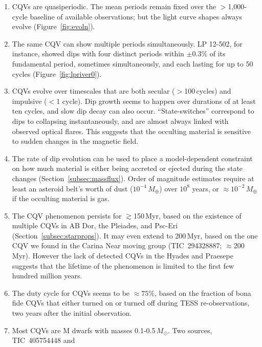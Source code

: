 \documentclass[11pt,twocolumn,tighten]{aastex63}
\begin{document}
\begin{enumerate}[leftmargin=*]
    \item CQVs are quasiperiodic.  The mean periods remain fixed over
      the $>$1{,}000-cycle baseline of available observations; but the
      light curve shapes always evolve (Figure~\ref{fig:evoln}).
    \item The same CQV can show multiple periods simultaneously.  LP
      12-502, for instance, showed dips with four distinct periods
      within $\pm 0.3\%$ of its fundamental period, sometimes
      simultaneously, and each lasting for up to 50 cycles
      (Figure~\ref{fig:lpriver0}).
    \item CQVs evolve over timescales that are both secular
      ($>$100\,cycles) and impulsive ($<$1 cycle).  Dip growth seems
      to happen over durations of at least ten cycles, and slow dip
      decay can also occur.  ``State-switches'' correspond to dips to
      collapsing instantaneously, and are almost always linked with
      observed optical flares.  This suggests that the occulting
      material is sensitive to sudden changes in the magnetic field.
    \item The rate of dip evolution can be used to place a
      model-dependent constraint on how much material is either being
      accreted or ejected during the state changes
      (Section~\ref{subsec:massflux}).  Order of magnitude estimates
      require at least an asteroid belt's worth of dust
      ($10^{-4}$\,$M_\oplus$) over $10^8$ years, or
      $\approx$$10^{-2}$\,$M_\oplus$ if the occulting material is gas.
    \item The CQV phenomenon persists for $\gtrsim$150\,Myr, based on
      the existence of multiple CQVs in AB Dor, the Pleiades, and
      Psc-Eri (Section~\ref{subsec:starprops}).  It may even extend to
      200\,Myr, based on the one CQV we found in the Carina Near
      moving group (TIC~294328887; $\approx$200\,Myr).  However the
      lack of detected CQVs in the Hyades and Praesepe suggests that
      the lifetime of the phenomenon is limited to the first few
      hundred million years.
    \item The duty cycle for CQVs seems to be $\approx$$75$\%, based
      on the fraction of bona fide CQVs that either turned on or turned
      off during TESS re-observations, two years after the initial
      observation.
    \item Most CQVs are M dwarfs with masses
      0.1-0.5\,$M_\odot$.  Two sources, TIC~405754448 and

\end{enumerate}
\end{document}
